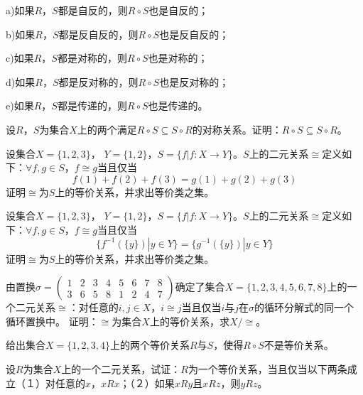 \documentclass{article}
\begin{document}
\begin{CJK}{UTF8}{gbsn}
\begin{Exercise}
  a)如果$R$，$S$都是自反的，则$R\circ S$也是自反的；

  b)如果$R$，$S$都是反自反的，则$R\circ S$也是反自反的；

  c)如果$R$，$S$都是对称的，则$R\circ S$也是对称的；

  d)如果$R$，$S$都是反对称的，则$R\circ S$也是反对称的；


  e)如果$R$，$S$都是传递的，则$R\circ S$也是传递的。
\end{Exercise}
\vspace{2cm}
\begin{Exercise}
设$R$，$S$为集合$X$上的两个满足$R\circ S\subseteq S\circ R$的对称关系。证明：$R\circ S\subseteq S\circ R$。
\end{Exercise}
  \vspace{10cm}
  \begin{Exercise}
    设集合$X = \{1,2,3\}$， $Y = \{1,2\}$，$S = \{f|f:X \to Y\}$。$S$上的二元关系$\cong$定义如下：$\forall f,g\in S$，$f \cong g$当且仅当\[f(1) + f(2) + f(3) = g(1) + g(2) + g(3)\]证明$\cong$为$S$上的等价关系，并求出等价类之集。    
  \end{Exercise}
  \vspace{10cm}
 \begin{Exercise}
  设集合$X = \{1,2,3\}$， $Y = \{1,2\}$，$S = \{f|f:X \to Y\}$。$S$上的二元关系$\cong$定义如下：$\forall f,g\in S$，$f \cong g$当且仅当\[\{f^{-1}(\{y\}) | y \in Y\} = \{g^{-1}(\{y\})|y \in Y\}\]证明$\cong$为$S$上的等价关系，并求出等价类之集。  
\end{Exercise}

\vspace{10cm}
\begin{Exercise}
由置换$\sigma=\begin{pmatrix}1&2&3&4&5&6&7&8\\3&6&5&8&1&2&4&7\end{pmatrix}$确定了集合$X=\{1,2,3,4,5,6,7,8\}$上的一个二元关系$\cong$：对任意的$i,j\in X$，$i\cong j$当且仅当$i$与$j$在$\sigma$的循环分解式的同一个循环置换中。
证明：$\cong$为集合$X$上的等价关系，求$X/\cong$。
\end{Exercise}
\vspace{5cm}
\begin{Exercise}
 给出集合$X=\{1,2,3,4\}$上的两个等价关系$R$与$S$，使得$R\circ S$不是等价关系。
\end{Exercise}
\vspace{10cm}
\begin{Exercise}
  设$R$为集合$X$上的一个二元关系，试证：$R$为一个等价关系，当且仅当以下两条成立（１）对任意的$x$，$xRx$；（２）如果$xRy$且$xRz$，则$yRz$。
\end{Exercise}
\vspace{10cm}


\end{CJK}
\end{document}
